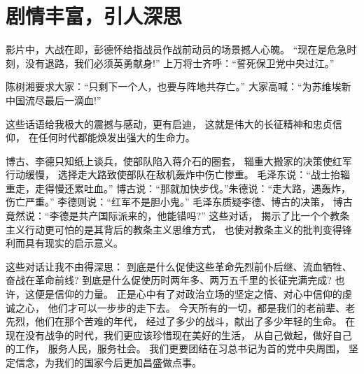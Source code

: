 \documentclass[a4paper]{article}
\begin{document}
\section{剧情丰富，引人深思}
影片中，大战在即，彭德怀给指战员作战前动员的场景撼人心魄。
“现在是危急时刻，没有退路，我们必须英勇献身!”
上万将士齐呼：“誓死保卫党中央过江。”


陈树湘要求大家：“只剩下一个人，也要与阵地共存亡。”
大家高喊：“为苏维埃新中国流尽最后一滴血!”


这些话语给我极大的震撼与感动，更有启迪，
这就是伟大的长征精神和忠贞信仰，
在任何时代都能焕发出强大的生命力。


博古、李德只知纸上谈兵，使部队陷入蒋介石的圈套，
辎重大搬家的决策使红军行动缓慢，
选择走大路致使部队在敌机轰炸中伤亡惨重。
毛泽东说：“战士抬辎重走，走得慢还累吐血。”
博古说：“那就加快步伐。”朱德说：“走大路，遇轰炸，伤亡严重。”
李德则说：“红军不是胆小鬼。”
毛泽东质疑李德、博古的决策，
博古竟然说：“李德是共产国际派来的，他能错吗?”
这些对话，
揭示了比一个个教条主义行动更可怕的是其背后的教条主义思维方式，
也使对教条主义的批判变得锋利而具有现实的启示意义。


这些对话让我不由得深思：
到底是什么促使这些革命先烈前仆后继、流血牺牲、奋战在革命前线?
到底是什么促使历时两年多、两万五千里的长征完满完成?
也许，这便是信仰的力量。
正是心中有了对政治立场的坚定之情、对心中信仰的虔诚之心，
他们才可以一步步的走下去。
今天所有的一切，都是我们的老前辈、老先烈，他们在那个苦难的年代，
经过了多少的战斗，献出了多少年轻的生命。
在现在没有战争的时代，我们更应该珍惜现在美好的生活，
从自己做起，做好自己的工作，
服务人民，服务社会。
我们更要团结在习总书记为首的党中央周围，
坚定信念，为我们的国家今后更加昌盛做点事。
\end{document}
